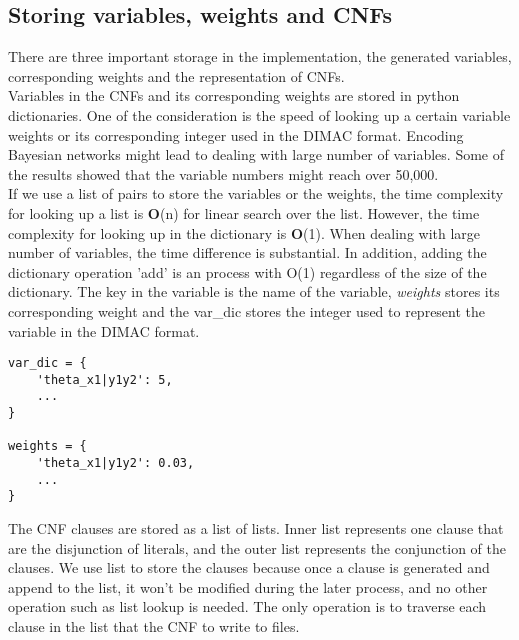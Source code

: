     
\subsection{Storing variables, weights and CNFs}
There are three important storage in the implementation, the generated variables, corresponding weights and the representation of CNFs.\\

\noindent Variables in the CNFs and its corresponding weights are stored in python dictionaries. One of the consideration is the speed of looking up  a certain variable weights or its corresponding integer used in the DIMAC format. Encoding Bayesian networks might lead to dealing with large number of variables. Some of the results \cite{2008-literature-review} showed that the variable numbers might reach over 50,000. \\

\noindent If we use a list of pairs to store the variables or the weights, the time complexity for looking up a list is \textbf{O}(n) for linear search over the list. However, the time complexity for looking up in the dictionary is \textbf{O}(1). When dealing with large number of variables, the time difference is substantial. In addition, adding the dictionary operation 'add' is an process with O(1) regardless of the size of the dictionary. The key in the variable is the name of the variable, \textit{weights} stores its corresponding weight and the var\_dic stores the integer used to represent the variable in the DIMAC format.

\begin{lstlisting}
var_dic = {
    'theta_x1|y1y2': 5,
    ...
}

weights = {
    'theta_x1|y1y2': 0.03,
    ...
}
\end{lstlisting}

\noindent The CNF clauses are stored as a list of lists. Inner list represents one clause that are the disjunction of literals, and the outer list represents the conjunction of the clauses. We use list to store the clauses because once a clause is generated and append to the list, it won't be modified during the later process, and no other operation such as list lookup is needed. The only operation is to traverse each clause in the list that the CNF to write to files.

